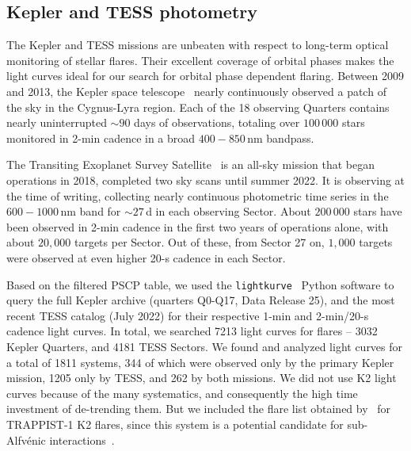 \documentclass[twocolumn]{aastex631}
\begin{document}
\subsection{Kepler and TESS photometry}
\label{sec:data:photometry}
The Kepler and TESS missions are unbeaten with respect to long-term optical monitoring of stellar flares. Their excellent coverage of orbital phases makes the light curves ideal for our search for orbital phase dependent flaring. Between 2009 and 2013, the Kepler space telescope~\citep{koch2010kepler} nearly continuously observed a patch of the sky in the Cygnus-Lyra region. Each of the 18 observing Quarters contains nearly uninterrupted $\sim 90$ days of observations, totaling over $100\,000$ stars monitored in 2-min cadence in a broad $400-850\,$nm bandpass.

The Transiting Exoplanet Survey Satellite~\citep[TESS,][]{ricker2015transiting} is an all-sky mission that began operations in 2018, completed two sky scans until summer 2022. It is observing at the time of writing, collecting nearly continuous photometric time series in the $600-1000\,$nm band for $\sim 27\,$d in each observing Sector. About $200\,000$ stars have been observed in 2-min cadence in the first two years of operations alone, with about $20,000$ targets per Sector. Out of these, from Sector 27 on, $1,000$ targets were observed at even higher 20-s cadence in each Sector. 

Based on the filtered PSCP table, we used the \texttt{lightkurve}~\citep{lightkurvecollaboration2018lightkurve} Python software to query the full Kepler archive (quarters Q0-Q17, Data Release 25), and the most recent TESS catalog (July 2022) for their respective 1-min and 2-min/20-s cadence light curves. In total, we searched 7213 light curves for flares -- 3032 Kepler Quarters, and 4181 TESS Sectors. We found and analyzed light curves for a total of 1811 systems, 344 of which were observed only by the primary Kepler mission, 1205 only by TESS, and 262 by both missions. We did not use K2 light curves because of the many systematics, and consequently the high time investment of de-trending them. But we included the flare list obtained by~\citet{paudel2018k2} for TRAPPIST-1 K2 flares, since this system is a potential candidate for sub-Alfv\'enic interactions~\citep{fischer2019timevariable}.
\end{document}

